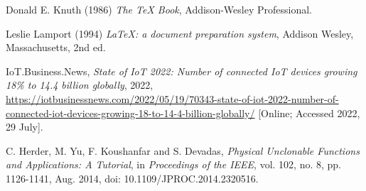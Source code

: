\begin{thebibliography}{9}
Donald E. Knuth (1986) \emph{The \TeX{} Book}, Addison-Wesley Professional.

Leslie Lamport (1994) \emph{\LaTeX: a document preparation system}, Addison
Wesley, Massachusetts, 2nd ed.

IoT.Business.News, \emph{State of IoT 2022: Number of connected IoT devices growing 18\% to 14.4 billion globally},  2022, \url{https://iotbusinessnews.com/2022/05/19/70343-state-of-iot-2022-number-of-connected-iot-devices-growing-18-to-14-4-billion-globally/} [Online; Accessed 2022, 29 July].

C. Herder, M. Yu, F. Koushanfar and S. Devadas, \emph{Physical Unclonable Functions and Applications: A Tutorial}, in \emph{Proceedings of the IEEE}, vol. 102, no. 8, pp. 1126-1141, Aug. 2014, doi: 10.1109/JPROC.2014.2320516.


    
\end{thebibliography}